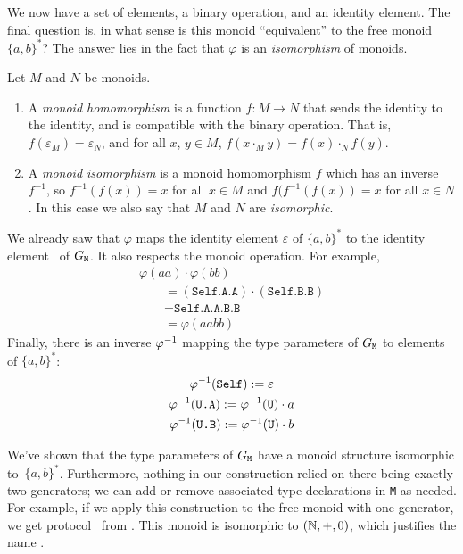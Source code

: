 \documentclass[../generics]{subfiles}
\begin{document}
We now have a set of elements, a binary operation, and an identity element. The final question is, in what sense is this monoid ``equivalent'' to the free monoid $\{a,b\}^*$? The answer lies in the fact that $\varphi$ is an \emph{isomorphism} of monoids.

\begin{definition}
Let $M$ and $N$ be monoids.
\begin{enumerate}
\item A \emph{monoid homomorphism} is a function $f\colon M\rightarrow N$ that sends the identity to the identity, and is compatible with the binary operation. That is, $f(\varepsilon_M)=\varepsilon_N$, and for all $x$, $y\in M$, $f(x\cdot_M y)=f(x)\cdot_N f(y)$.
\item A \emph{monoid isomorphism} is a monoid homomorphism $f$ which has an inverse $f^{-1}$, so $f^{-1}(f(x))=x$ for all $x\in M$ and $f(f^{-1}(f(x))=x$ for all $x\in N$. In this case we also say that $M$ and $N$ are \emph{isomorphic}.
\end{enumerate}
\end{definition}

We already saw that $\varphi$ maps the identity element $\varepsilon$ of $\{a,b\}^*$ to the identity element \tSelf\ of $G_\texttt{M}$. It also respects the monoid operation. For example,
\begin{gather*}
\varphi(aa)\cdot\varphi(bb)\\
\qquad {}=(\texttt{Self.A.A})\cdot(\texttt{Self.B.B})\\
\qquad {}=\texttt{Self.A.A.B.B}\\
\qquad {}=\varphi(aabb)
\end{gather*}
Finally, there is an inverse $\varphi^{-1}$ mapping the type parameters of $G_\texttt{M}$ to elements of $\{a,b\}^*$:
\begin{gather*}
\varphi^{-1}(\texttt{Self}):=\varepsilon\\
\varphi^{-1}(\texttt{U.A}):=\varphi^{-1}(\texttt{U})\cdot a\\
\varphi^{-1}(\texttt{U.B}):=\varphi^{-1}(\texttt{U})\cdot b
\end{gather*}

We've shown that the type parameters of $G_\texttt{M}$ have a monoid structure isomorphic to~$\{a,b\}^*$. Furthermore, nothing in our construction relied on there being exactly two generators; we can add or remove associated type declarations in \texttt{M} as needed. For example, if we apply this construction to the free monoid with one generator, we get protocol \tN\ from . This monoid is isomorphic to $(\mathbb{N},+,0)$, which justifies the name \tN.
\end{document}
